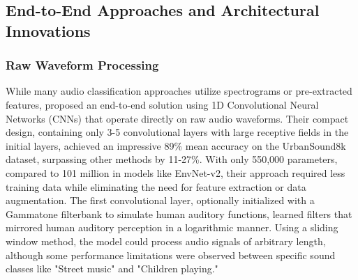 \documentclass[11pt]{article}
\begin{document}
\subsection{End-to-End Approaches and Architectural Innovations}

\subsubsection{Raw Waveform Processing}
While many audio classification approaches utilize spectrograms or pre-extracted features, \citep{abdoli2019endtoendenvironmentalsoundclassification} proposed an end-to-end solution using 1D Convolutional Neural Networks (CNNs) that operate directly on raw audio waveforms. Their compact design, containing only 3-5 convolutional layers with large receptive fields in the initial layers, achieved an impressive 89\% mean accuracy on the UrbanSound8k dataset, surpassing other methods by 11-27\%. With only 550,000 parameters, compared to 101 million in models like EnvNet-v2, their approach required less training data while eliminating the need for feature extraction or data augmentation. The first convolutional layer, optionally initialized with a Gammatone filterbank to simulate human auditory functions, learned filters that mirrored human auditory perception in a logarithmic manner. Using a sliding window method, the model could process audio signals of arbitrary length, although some performance limitations were observed between specific sound classes like "Street music" and "Children playing."
\end{document}
